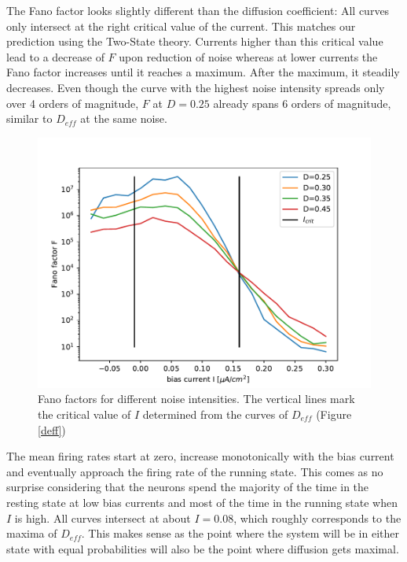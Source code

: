 \documentclass[12pt,a4paper]{article}
\begin{document}
The Fano factor looks slightly different than the diffusion coefficient: All curves only intersect at the right critical value of the current. This matches our prediction using the Two-State theory. Currents higher than this critical value lead to a decrease of $F$ upon reduction of noise whereas at lower currents the Fano factor increases until it reaches a maximum. After the maximum, it steadily decreases. Even though the curve with the highest noise intensity spreads only over 4 orders of magnitude, $F$ at $D=0.25$ already spans  6 orders of magnitude, similar to $D_{eff}$ at the same noise. 
\begin{figure}[H]
	\centering
	\includegraphics[scale=1]{fneur23critrealfast16alcoarsewstfrealfast9acoarsetf.pdf}\caption{Fano factors for different noise intensities. The vertical lines mark the critical value of $I$ determined from the curves of $D_{eff}$ (Figure \ref{deff})}
	\label{fano}
\end{figure}
The mean firing rates start at zero, increase monotonically with the bias current and eventually approach the firing rate of the running state. This comes as no surprise considering that the neurons spend the majority of the time in the resting state at low bias currents and most of the time in the running state when $I$ is high. All curves intersect at about $I=0.08$, which roughly corresponds to the maxima of $D_{eff}$. This makes sense as the point where the system will be in either state with equal probabilities will also be the point where diffusion gets maximal.
\end{document}
